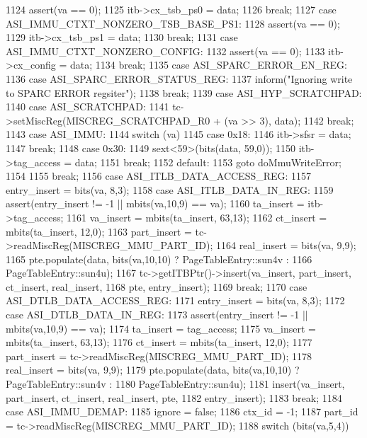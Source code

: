 \begin{DoxyCode}
{{1124         assert(va == 0);
1125         itb->cx_tsb_ps0 = data;
1126         break;
1127       case ASI_IMMU_CTXT_NONZERO_TSB_BASE_PS1:
1128         assert(va == 0);
1129         itb->cx_tsb_ps1 = data;
1130         break;
1131       case ASI_IMMU_CTXT_NONZERO_CONFIG:
1132         assert(va == 0);
1133         itb->cx_config = data;
1134         break;
1135       case ASI_SPARC_ERROR_EN_REG:
1136       case ASI_SPARC_ERROR_STATUS_REG:
1137         inform("Ignoring write to SPARC ERROR regsiter\n");
1138         break;
1139       case ASI_HYP_SCRATCHPAD:
1140       case ASI_SCRATCHPAD:
1141         tc->setMiscReg(MISCREG_SCRATCHPAD_R0 + (va >> 3), data);
1142         break;
1143       case ASI_IMMU:
1144         switch (va) {
1145           case 0x18:
1146             itb->sfsr = data;
1147             break;
1148           case 0x30:
1149             sext<59>(bits(data, 59,0));
1150             itb->tag_access = data;
1151             break;
1152           default:
1153             goto doMmuWriteError;
1154         }
1155         break;
1156       case ASI_ITLB_DATA_ACCESS_REG:
1157         entry_insert = bits(va, 8,3);
1158       case ASI_ITLB_DATA_IN_REG:
1159         assert(entry_insert != -1 || mbits(va,10,9) == va);
1160         ta_insert = itb->tag_access;
1161         va_insert = mbits(ta_insert, 63,13);
1162         ct_insert = mbits(ta_insert, 12,0);
1163         part_insert = tc->readMiscReg(MISCREG_MMU_PART_ID);
1164         real_insert = bits(va, 9,9);
1165         pte.populate(data, bits(va,10,10) ? PageTableEntry::sun4v :
1166                 PageTableEntry::sun4u);
1167         tc->getITBPtr()->insert(va_insert, part_insert, ct_insert, real_insert,
1168                 pte, entry_insert);
1169         break;
1170       case ASI_DTLB_DATA_ACCESS_REG:
1171         entry_insert = bits(va, 8,3);
1172       case ASI_DTLB_DATA_IN_REG:
1173         assert(entry_insert != -1 || mbits(va,10,9) == va);
1174         ta_insert = tag_access;
1175         va_insert = mbits(ta_insert, 63,13);
1176         ct_insert = mbits(ta_insert, 12,0);
1177         part_insert = tc->readMiscReg(MISCREG_MMU_PART_ID);
1178         real_insert = bits(va, 9,9);
1179         pte.populate(data, bits(va,10,10) ? PageTableEntry::sun4v :
1180                 PageTableEntry::sun4u);
1181         insert(va_insert, part_insert, ct_insert, real_insert, pte,
1182                entry_insert);
1183         break;
1184       case ASI_IMMU_DEMAP:
1185         ignore = false;
1186         ctx_id = -1;
1187         part_id =  tc->readMiscReg(MISCREG_MMU_PART_ID);
1188         switch (bits(va,5,4)) {
}}}
\end{DoxyCode}
